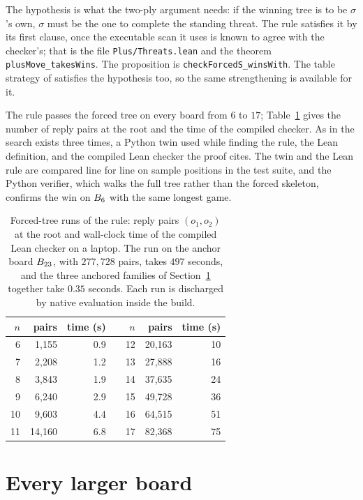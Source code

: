 \documentclass[11pt]{amsart}
\theoremstyle{definition}
\theoremstyle{remark}
\begin{document}
The hypothesis is what the two-ply argument needs: if the winning
tree is to be $\sigma$'s own, $\sigma$ must be the one to complete the
standing threat. The rule satisfies it by its first clause, once the
executable scan it uses is known to agree with the checker's; that is
the file \texttt{Plus/Threats.lean} and the theorem
\texttt{plusMove\_takesWins}. The proposition is
\texttt{checkForcedS\_winsWith}. The table strategy of
\cite{reid-threshold} satisfies the hypothesis too, so the same
strengthening is available for it.

The rule passes the forced tree on every board from $6$ to $17$;
Table~\ref{tab:runs} gives the number of reply pairs at the root and
the time of the compiled checker. As in \cite{reid-threshold} the
search exists three times, a Python twin used while finding the rule,
the Lean definition, and the compiled Lean checker the proof cites.
The twin and the Lean rule are compared line for line on sample
positions in the test suite, and the Python verifier, which walks the
full tree rather than the forced skeleton, confirms the win on
$B_6$ with the same longest game.

\begin{table}[ht]
\centering
\begin{tabular}{rrrcrrr}
\toprule
$n$ & pairs & time (s) & & $n$ & pairs & time (s) \\
\midrule
6 & 1{,}155 & 0.9 & & 12 & 20{,}163 & 10 \\
7 & 2{,}208 & 1.2 & & 13 & 27{,}888 & 16 \\
8 & 3{,}843 & 1.9 & & 14 & 37{,}635 & 24 \\
9 & 6{,}240 & 2.9 & & 15 & 49{,}728 & 36 \\
10 & 9{,}603 & 4.4 & & 16 & 64{,}515 & 51 \\
11 & 14{,}160 & 6.8 & & 17 & 82{,}368 & 75 \\
\bottomrule
\end{tabular}
\medskip
\caption{Forced-tree runs of the rule: reply pairs $(o_1, o_2)$ at the
root and wall-clock time of the compiled Lean checker on a laptop. The
run on the anchor board $B_{23}$, with $277{,}728$ pairs, takes
$497$ seconds, and the three anchored families of
Section~\ref{sec:uniform} together take $0.35$ seconds. Each run is
discharged by native evaluation inside the build.}
\label{tab:runs}
\end{table}

\section{Every larger board}\label{sec:uniform}
\end{document}
